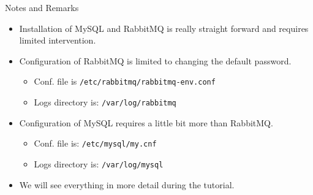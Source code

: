 \documentclass[english,serif,mathserif]{beamer}
\begin{document}
\begin{frame}{Notes and Remarks}

\begin{itemize}
\item Installation of MySQL and RabbitMQ is really straight forward
and requires limited intervention. 
\item Configuration of RabbitMQ is limited to changing the default password.
      \begin{itemize}
          \item Conf. file is \texttt{/etc/rabbitmq/rabbitmq-env.conf}
          \item Logs directory is: \texttt{/var/log/rabbitmq} 
      \end{itemize} 
\item Configuration of MySQL requires a little bit more than RabbitMQ.
      \begin{itemize}
        \item Conf. file is: \texttt{/etc/mysql/my.cnf}
        \item Logs directory is: \texttt{/var/log/mysql}
      \end{itemize}
\item We will see everything in more detail during the tutorial.
\end{itemize}

\end{frame}
\end{document}
